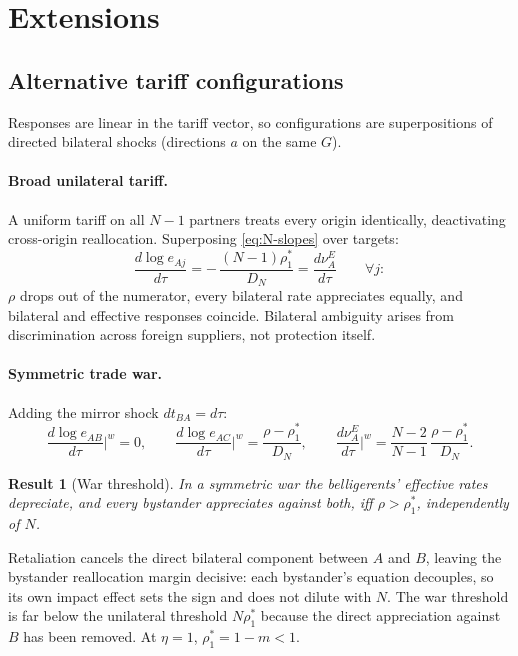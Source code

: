 \documentclass[11pt]{article}
\newtheorem{result}{Result}[section]
\begin{document}
\section{Extensions}

\subsection{Alternative tariff configurations}

Responses are linear in the tariff vector, so configurations are superpositions of directed bilateral shocks (directions $a$ on the same $G$).

\paragraph{Broad unilateral tariff.} A uniform tariff on all $N-1$ partners treats every origin identically, deactivating cross-origin reallocation. Superposing \eqref{eq:N-slopes} over targets:
\begin{equation}
\frac{d\log e_{Aj}}{d\tau} = -\,\frac{(N-1)\rho_1^*}{D_N} = \frac{d\nu_A^E}{d\tau}
\qquad \forall j :
\label{eq:N-broad}
\end{equation}
$\rho$ drops out of the numerator, every bilateral rate appreciates equally, and bilateral and effective responses coincide. Bilateral ambiguity arises from discrimination across foreign suppliers, not protection itself.

\paragraph{Symmetric trade war.} Adding the mirror shock $dt_{BA} = d\tau$:
\begin{equation}
\frac{d\log e_{AB}}{d\tau}\bigg|^{w} = 0,
\qquad
\frac{d\log e_{AC}}{d\tau}\bigg|^{w} = \frac{\rho - \rho_1^*}{D_N},
\qquad
\frac{d\nu_A^{E}}{d\tau}\bigg|^{w} = \frac{N-2}{N-1}\,\frac{\rho - \rho_1^*}{D_N} .
\label{eq:N-war}
\end{equation}

\begin{result}[War threshold]
In a symmetric war the belligerents' effective rates depreciate, and every bystander appreciates against both, iff
$\rho > \rho_1^*$, independently of $N$.
\label{res:war}
\end{result}

\noindent Retaliation cancels the direct bilateral component between $A$ and $B$, leaving the bystander reallocation margin decisive: each bystander's equation decouples, so its own impact effect sets the sign and does not dilute with $N$. The war threshold is far below the unilateral threshold $N\rho_1^*$ because the direct appreciation against $B$ has been removed. At $\eta = 1$, $\rho_1^* = 1 - m < 1$.
\end{document}
